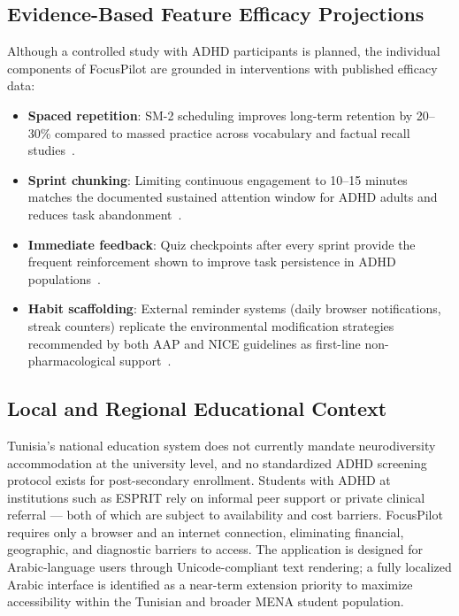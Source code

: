 \documentclass[conference]{IEEEtran}
\begin{document}
\subsection{Evidence-Based Feature Efficacy Projections}

Although a controlled study with ADHD participants is planned, the individual components of FocusPilot are grounded in interventions with published efficacy data:

\begin{itemize}
  \item \textbf{Spaced repetition}: SM-2 scheduling improves long-term retention by 20--30\% compared to massed practice across vocabulary and factual recall studies~\cite{cepeda2006distributed,wozniak1990optimization}.
  \item \textbf{Sprint chunking}: Limiting continuous engagement to 10--15 minutes matches the documented sustained attention window for ADHD adults and reduces task abandonment~\cite{faraone2015attention}.
  \item \textbf{Immediate feedback}: Quiz checkpoints after every sprint provide the frequent reinforcement shown to improve task persistence in ADHD populations~\cite{barkley1997adhd}.
  \item \textbf{Habit scaffolding}: External reminder systems (daily browser notifications, streak counters) replicate the environmental modification strategies recommended by both AAP and NICE guidelines as first-line non-pharmacological support~\cite{wolraich2019clinical,nice2018adhd}.
\end{itemize}

\subsection{Local and Regional Educational Context}

Tunisia's national education system does not currently mandate neurodiversity accommodation at the university level, and no standardized ADHD screening protocol exists for post-secondary enrollment. Students with ADHD at institutions such as ESPRIT rely on informal peer support or private clinical referral — both of which are subject to availability and cost barriers. FocusPilot requires only a browser and an internet connection, eliminating financial, geographic, and diagnostic barriers to access. The application is designed for Arabic-language users through Unicode-compliant text rendering; a fully localized Arabic interface is identified as a near-term extension priority to maximize accessibility within the Tunisian and broader MENA student population.
\end{document}
